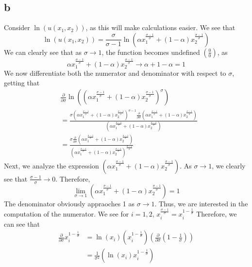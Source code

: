 \documentclass[12pt]{article}
\begin{document}
\subsection*{b}
Consider $\ln(u(x_1,x_2))$, as this will make calculations easier. We see that 
\[
\ln(u(x_1, x_2)) = \frac{\sigma}{\sigma - 1} \ln \left( \alpha x_1^{\frac{\sigma -1}{\sigma}} + (1-\alpha)x_2^{\frac{\sigma - 1}{\sigma}} \right)
\] 
We can clearly see that as $\sigma \to 1$, the function becomes undefined $(\frac{0}{0})$, as 
\[
\alpha x_1^{\frac{\sigma-1}{\sigma}} + (1-\alpha)x_2^{\frac{\sigma-1}{\sigma}} \to \alpha + 1-\alpha = 1
\]
We now differentiate both the numerator and denominator with respect to $\sigma$, getting that 
\begin{align*}
     & \frac{\partial }{\partial \sigma} \ln\left(\left( \alpha x_1^{\frac{\sigma -1}{\sigma}} + (1-\alpha)x_2^{\frac{\sigma - 1}{\sigma}} \right)^{\sigma}\right) \\
    &= \frac{\sigma \left( \alpha x_1^{\frac{\sigma -1}{\sigma}} + (1-\alpha)x_2^{\frac{\sigma - 1}{\sigma}} \right)^{\sigma - 1} \frac{\partial }{\partial \sigma} \left( \alpha x_1^{\frac{\sigma -1}{\sigma}} + (1-\alpha)x_2^{\frac{\sigma-1}{\sigma}}\right)}{\left( \alpha x_1^{\frac{\sigma -1}{\sigma}} + (1-\alpha)x_2^{\frac{\sigma - 1}{\sigma}} \right)}\\
    &= \frac{\sigma \frac{\partial }{\partial \sigma}\left( \alpha x_1^{\frac{\sigma -1}{\sigma}} + (1-\alpha)x_2^{\frac{\sigma - 1}{\sigma}} \right)}{\left( \alpha x_1^{\frac{\sigma -1}{\sigma}} + (1-\alpha)x_2^{\frac{\sigma - 1}{\sigma}} \right)^{\frac{\sigma - 1}{\sigma}}}
\end{align*}
 Next, we analyze the expression $\left( \alpha x_1^{\frac{\sigma -1}{\sigma}} + (1-\alpha)x_2^{\frac{\sigma - 1}{\sigma}} \right)$. As $\sigma \to 1$, we clearly see that $\frac{\sigma - 1}{\sigma} \to 0$. Therefore, 
\[
\lim_{\sigma \to 1} \left( \alpha x_1^{\frac{\sigma -1}{\sigma}} + (1-\alpha)x_2^{\frac{\sigma - 1}{\sigma}} \right) = 1
\]
 The denominator obviously appraoches 1 as $\sigma \to 1$. Thus, we are interested in the computation of the numerator. We see for $i = 1,2 $, $x_i^{\frac{\sigma - 1}{\sigma}} = x_i^{1 - \frac{1}{\sigma}}$ Therefore, we can see that 
\begin{align*}
    \frac{\partial }{\partial \sigma} x_i^{1 - \frac{1}{\sigma}} &= \ln(x_i)\left( x_i^{1 - \frac{1}{\sigma}} \right) \left( \frac{\partial }{\partial \sigma} \left( 1 - \frac{1}{\sigma} \right) \right)\\
    &= \frac{1}{\sigma^2}\left( \ln(x_i) x_i^{1 - \frac{1}{\sigma}} \right)
\end{align*}
\end{document}
